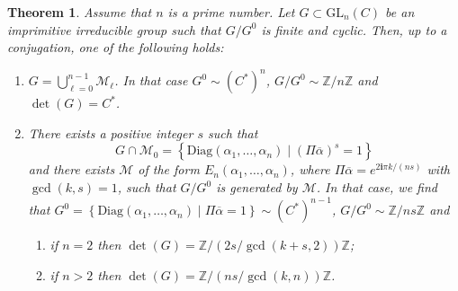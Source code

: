 \documentclass[a4paper,11pt]{amsart}
\newtheorem{thm}{Theorem}[section]
\def\Z{\mathbb{Z}}
\begin{document}
\begin{thm}\label{thm1}
Assume that $n$ is a prime number.  Let $G \subset \mathrm{GL}_n (C)$ be an imprimitive irreducible group such that $G/G^{0}$ is finite and cyclic. Then, up to a conjugation,  one of the following holds:
\begin{enumerate}
 \item\label{cas1} $G= \displaystyle \bigcup_{\ell=0}^{n-1} \mathcal{M}_{\ell}$. In that case $G^0\sim (C^*)^n$,  
$G/G^0 \sim  \Z/ n \Z$  and $\det(G)=C^*$.
 \item\label{cas2} There exists a positive integer $s$ such that 
 $$G\cap \mathcal{M}_0= \left\{\mathrm{Diag}(\alpha_{1},\dots, \alpha_n)\mid  (\Pi\overline{\alpha})^{s}=1\right\}$$ and there exists $\mathscr{M}$ of the form $E_n\left(\alpha_{1},\dots, \alpha_n\right)$, where $\Pi \overline{\alpha}=e^{2\mathbf{i}\pi k/(ns)}$ with $\gcd (k,s)=1$, such that $G/G^0$ is generated by $\mathscr{M}$.  In that case,  we find  that 
 ${G^0=  \left\{\mathrm{Diag}(\alpha_{1},\dots, \alpha_n)\mid \Pi\overline{\alpha}=1\right\}\sim (C^*)^{n-1}}$, 
$G/G^0 \sim  \Z/ ns \Z$  and 
 \begin{enumerate}
\item\label{cas21}   if $n=2$ then  $\det(G)=\Z/  (2s/\gcd(k+s,2)) \Z$;
\item\label{cas22}  if $n> 2$ then   $\det(G)=\Z/  (ns/\gcd(k,n)) \Z$.
 \end{enumerate}
\end{enumerate}
\end{thm}
\end{document}
